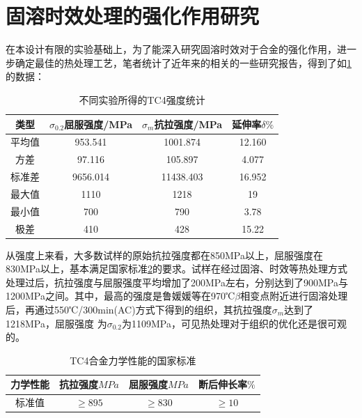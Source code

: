 
\section{固溶时效处理的强化作用研究}
在本设计有限的实验基础上，为了能深入研究固溶时效对于\ti 合金的强化作用，进一步确定最佳的热处理工艺，笔者统计了近年来的相关的一些研究报告，得到了如\ref{sec:mytcstrengthave}的数据：
\begin{table}[htbp]
	\centering
	\caption{不同实验所得的TC4强度统计}
	\label{sec:mytcstrengthave}
	\begin{tabular}{cccc}
		\toprule
		类型& $ \sigma_{0.2} $屈服强度/MPa  &$ \sigma_m $抗拉强度/MPa &延伸率$ \delta \% $ \\ \midrule
		平均值 & 953.541& 1001.874&12.160 \\
		方差 &97.116& 105.897& 4.077 \\
		标准差 &9656.014&11438.403&16.952 \\
		最大值 &  1110 & 1218 & 19 \\
		最小值&700 & 790 & 3.78 \\
		极差&410 & 428 & 15.22 \\
		\bottomrule
	\end{tabular}
\end{table}


从强度上来看，大多数试样的原始抗拉强度都在850MPa以上，屈服强度在830MPa以上，基本满足国家标准\ref{sec:mytc4machins}的要求。试样在经过固溶、时效等热处理方式处理过后，抗拉强度与屈服强度平均增加了200MPa左右，分别达到了900MPa与1200MPa之间。其中，最高的强度是鲁媛媛等\cite{luyuanyuanShixiaochuliduiTC4taihejinweiguanzuzhihelixuexingnengdeyingxiang2019}在970℃$ \beta $相变点附近进行固溶处理后，再通过550℃/300min(AC)方式下得到的组织，其抗拉强度$ \sigma_m $达到了1218MPa，屈服强度%
为$ \sigma_{0.2} $为1109MPa，可见热处理对于组织的优化还是很可观的。
\begin{table}[htbp]
	\centering
	\caption{TC4合金力学性能的国家标准}
	\label{sec:mytc4machins}
	\begin{tabular}{cccc}
		\toprule
		力学性能& 抗拉强度$MPa  $& 屈服强度$ MPa $&断后伸长率$ \% $\\ \midrule
		标准值 &$ \ge 895 $&$ \ge 830 $&$ \ge 10 $ \\ \bottomrule
	\end{tabular}
\end{table}


